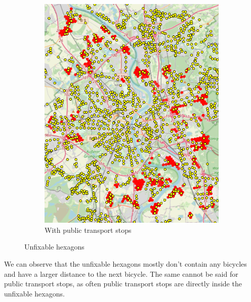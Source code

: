 \begin{figure}
\begin{subfigure}[b]{0.30\textwidth}
         \includegraphics[width=\textwidth]{Figures/results/problematic_hexagons/unfixable_with_stops.png}
         \caption{With public transport stops}
         \label{fig:unfixable_with_stops}
     \end{subfigure}
     \hfill
     \caption{Unfixable hexagons}
     \label{fig:unfixable_hexagons}
\end{figure}
We can observe that the unfixable hexagons mostly don't contain any bicycles and have a larger distance to the next bicycle.
The same cannot be said for public transport stops, as often public transport stops are directly inside the unfixable hexagons.

